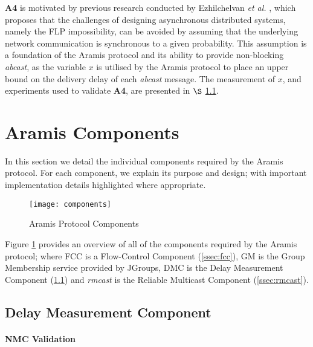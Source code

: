 \begin{description}
    	\textbf{A4} is motivated by previous research conducted by Ezhilchelvan \emph{et al.} \citep{Ezhilchelvan:2010:LPR:1773912.1773927}, which proposes that the challenges of designing asynchronous distributed systems, namely the FLP impossibility, can be avoided by assuming that the underlying network communication is synchronous to a given probability.  This assumption is a foundation of the \textsf{Aramis} protocol and its ability to provide non-blocking \emph{abcast}, as the variable $x$ is utilised by the \textsf{Aramis} protocol to place an upper bound on the delivery delay of each \emph{abcast} message.  The measurement of $x$, and experiments used to validate \textbf{A4}, are presented in $\S$ \ref{ssec:dmc}.  	
	\end{description}
	
\section{Aramis Components}
In this section we detail the individual components required by the \textsf{Aramis} protocol.  For each component, we explain its purpose and design; with important implementation details highlighted where appropriate.  

    \begin{figure}[!h] 
        \centering    
         \texttt{[image: components]}
         \caption[Aramis Protocol Components Overview]{Aramis Protocol Components}
         \label{fig:aramis_components}
    \end{figure}
    
   Figure \ref{fig:aramis_components} provides an overview of all of the components required by the \textsf{Aramis} protocol; where FCC is a Flow-Control Component (\ref{ssec:fcc}), GM is the Group Membership service provided by JGroups, DMC is the Delay Measurement Component (\ref{ssec:dmc}) and \emph{rmcast} is the Reliable Multicast Component (\ref{ssec:rmcast}).  

	\subsection{Delay Measurement Component}\label{ssec:dmc}
	    \paragraph{NMC Validation}\label{a4_validation}\hspace{0pt} \\
	    
